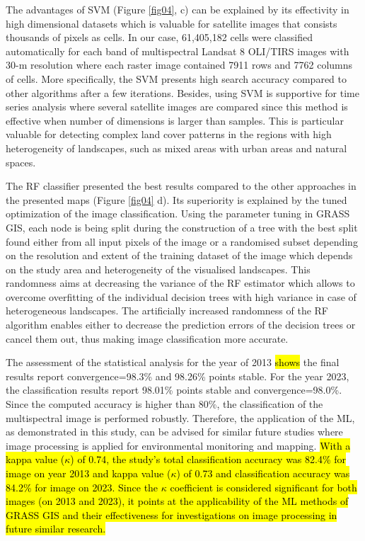 \documentclass[final,5p,times,twocolumn]{elsarticle}
\numberwithin{table}{section}
\begin{document}
The advantages of SVM (Figure \ref{fig04}, c) can be explained by its effectivity in high dimensional datasets which is valuable for satellite images that consists thousands of pixels as cells. In our case, 61,405,182 cells were classified automatically for each band of multispectral Landsat 8 OLI/TIRS images with 30-m resolution where each raster image contained 7911 rows and 7762 columns of cells. More specifically, the SVM presents high search accuracy compared to other algorithms after a few iterations. Besides, using SVM is supportive for time series analysis where several satellite images are compared since this method is effective when number of dimensions is larger than samples. This is particular valuable for detecting complex land cover patterns in the regions with high heterogeneity of landscapes, such as mixed areas with urban areas and natural spaces. 

The RF classifier presented the best results compared to the other approaches in the presented maps (Figure \ref{fig04} d). Its superiority is explained by the tuned optimization of the image classification. Using the parameter tuning in GRASS GIS, each node is being split during the construction of a tree with the best split found either from all input pixels of the image or a randomised subset depending on the resolution and extent of the training dataset of the image which depends on the study area and heterogeneity of the visualised landscapes. This randomness aims at decreasing the variance of the RF estimator which allows to overcome overfitting of the individual decision trees with high variance in case of heterogeneous landscapes. The artificially increased randomness of the RF algorithm enables either to decrease the prediction errors of the decision trees or cancel them out, thus making image classification more accurate.

The assessment of the statistical analysis\hl{ }for the year of 2013 \hl{shows} the final results report convergence=98.3\% and 98.26\% points stable. For the year 2023, the classification results report 98.01\% points stable and convergence=98.0\%. Since the computed accuracy is higher than 80\%, the classification of the multispectral image is performed robustly. Therefore, the application of the ML, as demonstrated in this study, can be advised for similar future studies where image processing is applied for environmental monitoring and mapping. \hl{With a kappa value ($\kappa$) of 0.74, the study's total classification accuracy was 82.4\% for image on year 2013 and kappa value ($\kappa$) of 0.73 and classification accuracy was 84.2\% for image on 2023. Since the $\kappa$ coefficient is considered significant for both images (on 2013 and 2023), it points at the applicability of the ML methods of GRASS GIS and their effectiveness for investigations on image processing in future similar research. }
\end{document}
